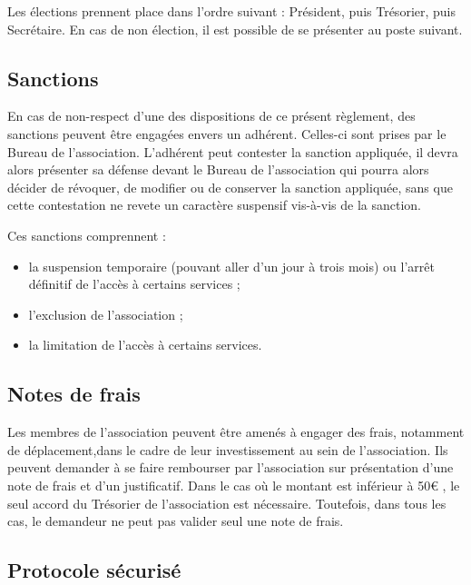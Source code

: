 \documentclass[12pt, a4paper]{article}
\begin{document}
	\bigskip

	Les élections prennent place dans l'ordre suivant : Président, puis Trésorier,
	puis Secrétaire. En cas de non élection, il est possible de se présenter au
	poste suivant.

	\subsection{Sanctions}

	En cas de non-respect d'une des dispositions de ce présent règlement, des
	sanctions peuvent être engagées envers un adhérent. Celles-ci sont prises par le
	Bureau de l'association. L'adhérent peut contester la sanction appliquée, il devra
	alors présenter sa défense devant le Bureau de l'association qui pourra alors décider
	de révoquer, de modifier ou de conserver la sanction appliquée, sans que cette
	contestation ne revete un caractère suspensif vis-à-vis de la sanction.

	\bigskip

	Ces sanctions comprennent :

	\bigskip

	\begin{itemize}
		\item[\textbullet] la suspension temporaire (pouvant aller d'un jour à trois
			mois) ou l'arrêt définitif de l'accès à certains services ;

		\item[\textbullet] l'exclusion de l'association ;

		\item[\textbullet] la limitation de l'accès à certains services.
	\end{itemize}

	\subsection{Notes de frais}

	Les membres de l'association peuvent être amenés à engager des frais,
	notamment de déplacement,dans le cadre de leur investissement au sein de l'association.
	Ils peuvent demander à se faire rembourser par l'association sur présentation d'une
	note de frais et d'un justificatif. Dans le cas où le montant est inférieur à
	50€ , le seul accord du Trésorier de l'association est nécessaire. Toutefois,
	dans tous les cas, le demandeur ne peut pas valider seul une note de frais.

	\subsection{Protocole sécurisé}
\end{document}
